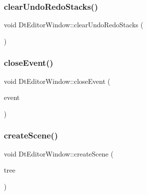 \subsubsection{\texorpdfstring{clearUndoRedoStacks()}{clearUndoRedoStacks()}}
{\footnotesize\ttfamily void Dt\+Editor\+Window\+::clear\+Undo\+Redo\+Stacks (\begin{DoxyParamCaption}{ }\end{DoxyParamCaption})\hspace{0.3cm}{\ttfamily [protected]}}

\mbox{\label{class_dt_editor_window_aafce6f85dd9803cca88d982226ad37aa}} 
\subsubsection{\texorpdfstring{closeEvent()}{closeEvent()}}
{\footnotesize\ttfamily void Dt\+Editor\+Window\+::close\+Event (\begin{DoxyParamCaption}\item[{Q\+Close\+Event $\ast$}]{event }\end{DoxyParamCaption})\hspace{0.3cm}{\ttfamily [protected]}}

\mbox{\label{class_dt_editor_window_ae45d5775844c3cc795b70e5a97e682a7}} 
\subsubsection{\texorpdfstring{createScene()}{createScene()}}
{\footnotesize\ttfamily void Dt\+Editor\+Window\+::create\+Scene (\begin{DoxyParamCaption}\item[{std\+::shared\+\_\+ptr$<$ \mbox{\hyperlink{classdtree_1_1_decision_tree}{dtree\+::\+Decision\+Tree}} $>$}]{tree }\end{DoxyParamCaption})\hspace{0.3cm}{\ttfamily [protected]}}

\mbox{\label{class_dt_editor_window_ab7a3269c8ed4eb4d81f39246cc3c4dbb}} 
